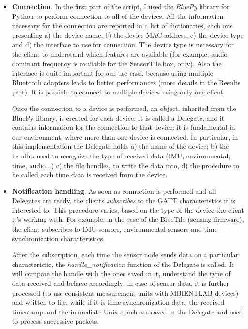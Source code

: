 \begin{itemize}
    \item \textbf{Connection}. In the first part of the script, I used the \textit{BluePy} library for Python to perform connection to all of the devices. All the information necessary for the connection are reported in a list of dictionaries, each one presenting a) the device name, b) the device MAC address, c) the device type and d) the interface to use for connection. The device type is necessary for the client to understand which features are available (for example, audio dominant frequency is available for the SensorTile.box, only). Also the interface is quite important for our use case, because using multiple Bluetooth adapters leads to better performances (more details in the Results part). It is possible to connect to multiple devices using only one client.

    Once the connection to a device is performed, an object, inherited from the BluePy library, is created for each device. It is called a Delegate, and it contains information for the connection to that device: it is fundamental in our environment, where more than one device is connected. In particular, in this implementation the Delegate holds a) the name of the device; b) the handles used to recognize the type of received data (IMU, environmental, time, audio...) c) the file handles, to write the data into, d) the procedure to be called each time data is received from the device. 

    \item \textbf{Notification handling}. As soon as connection is performed and all Delegates are ready, the clients \textit{subscribes} to the GATT characteristics it is interested to. This procedure varies, based on the type of the device the client it's working with. For example, in the case of the BlueTile (sensing firmware), the client subscribes to IMU sensors, environmental sensors and time synchronization characteristics. 

    After the subscription, each time the sensor node sends data on a particular characteristic, the \textit{handle\_notification} function of the Delegate is called. It will compare the handle with the ones saved in it, understand the type of data received and behave accordingly: in case of sensor data, it is further processed (to use consistent measurement units with MBIENTLAB devices) and written to file, while if it is time synchronization data, the received timestamp and the immediate Unix epoch are saved in the Delegate and used to process successive packets. 


\end{itemize}

